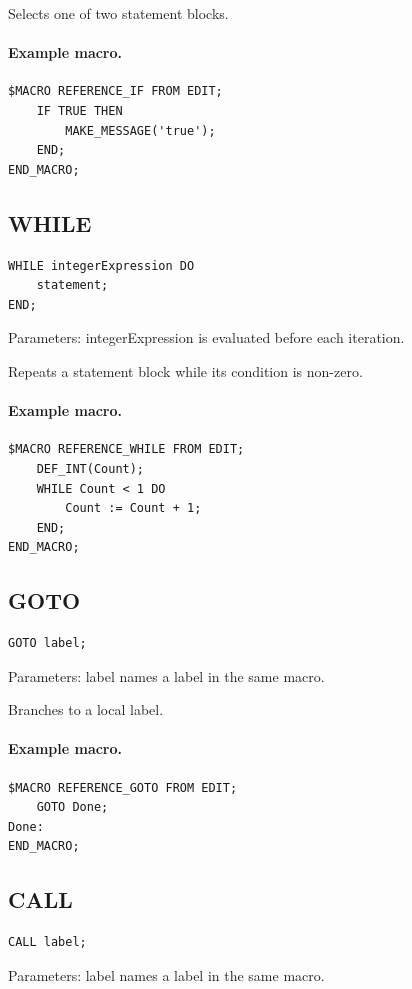 \documentclass[a4paper,10pt,twoside,openany]{book}
\begin{document}
Selects one of two statement blocks.

\paragraph{Example macro.}
\begin{verbatim}
$MACRO REFERENCE_IF FROM EDIT;
    IF TRUE THEN
        MAKE_MESSAGE('true');
    END;
END_MACRO;
\end{verbatim}

\label{prim:keyword-while}
\subsection*{WHILE}
\begin{verbatim}
WHILE integerExpression DO
    statement;
END;
\end{verbatim}
Parameters: integerExpression is evaluated before each iteration.

Repeats a statement block while its condition is non-zero.

\paragraph{Example macro.}
\begin{verbatim}
$MACRO REFERENCE_WHILE FROM EDIT;
    DEF_INT(Count);
    WHILE Count < 1 DO
        Count := Count + 1;
    END;
END_MACRO;
\end{verbatim}

\label{prim:keyword-goto}
\subsection*{GOTO}
\begin{verbatim}
GOTO label;
\end{verbatim}
Parameters: label names a label in the same macro.

Branches to a local label.

\paragraph{Example macro.}
\begin{verbatim}
$MACRO REFERENCE_GOTO FROM EDIT;
    GOTO Done;
Done:
END_MACRO;
\end{verbatim}

\label{prim:keyword-call}
\subsection*{CALL}
\begin{verbatim}
CALL label;
\end{verbatim}
Parameters: label names a label in the same macro.
\end{document}

